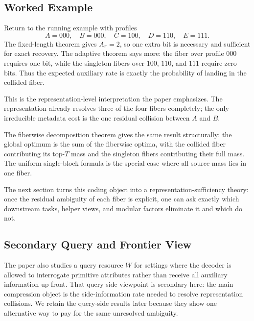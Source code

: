 \subsection{Worked Example}

Return to the running example with profiles
\[
A=000,\quad B=000,\quad C=100,\quad D=110,\quad E=111.
\]
The fixed-length theorem gives $A_\pi=2$, so one extra bit is necessary and sufficient for exact recovery. The adaptive theorem says more: the fiber over profile $000$ requires one bit, while the singleton fibers over $100$, $110$, and $111$ require zero bits. Thus the expected auxiliary rate is exactly the probability of landing in the collided fiber.

This is the representation-level interpretation the paper emphasizes. The representation already resolves three of the four fibers completely; the only irreducible metadata cost is the one residual collision between $A$ and $B$.

The fiberwise decomposition theorem gives the same result structurally: the global optimum is the sum of the fiberwise optima, with the collided fiber contributing its top-$T$ mass and the singleton fibers contributing their full mass. The uniform single-block formula is the special case where all source mass lies in one fiber.

The next section turns this coding object into a representation-sufficiency theory: once the residual ambiguity of each fiber is explicit, one can ask exactly which downstream tasks, helper views, and modular factors eliminate it and which do not.

\subsection{Secondary Query and Frontier View}

The paper also studies a query resource $W$ for settings where the decoder is allowed to interrogate primitive attributes rather than receive all auxiliary information up front. That query-side viewpoint is secondary here: the main compression object is the side-information rate needed to resolve representation collisions. We retain the query-side results later because they show one alternative way to pay for the same unresolved ambiguity.
